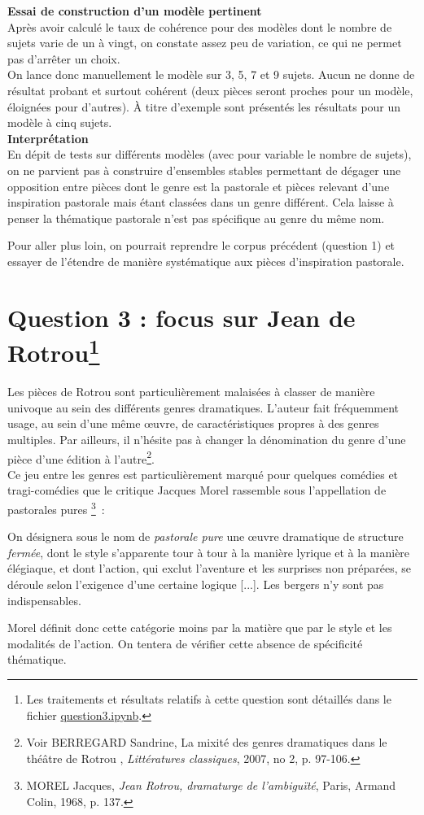 \documentclass[a4paper,twoside,12pt]{article}
\begin{document}
\textbf{Essai de construction d'un modèle pertinent}\\
Après avoir calculé le taux de cohérence pour des modèles dont le nombre de sujets varie de un à vingt, on constate assez peu de variation, ce qui ne permet pas d'arrêter un choix.\\
On lance donc manuellement le modèle sur 3, 5, 7 et 9 sujets. Aucun ne donne de résultat probant et surtout cohérent (deux pièces seront proches pour un modèle, éloignées pour d'autres). À titre d'exemple sont présentés les résultats pour un modèle à cinq sujets.\\

\textbf{Interprétation}\\
En dépit de tests sur différents modèles (avec pour variable le nombre de sujets), on ne parvient pas à construire d'ensembles stables permettant de dégager une opposition entre pièces dont le genre est la pastorale et pièces relevant d'une inspiration pastorale mais étant classées dans un genre différent.
Cela laisse à penser la thématique pastorale n'est pas spécifique au genre du même nom.

Pour aller plus loin, on pourrait reprendre le corpus précédent (question 1) et essayer de l'étendre de manière systématique aux pièces d'inspiration pastorale.

\section*{Question 3 : focus sur Jean de Rotrou\footnote{Les traitements et résultats relatifs à cette question sont détaillés dans le fichier \href{https://github.com/ragbx/enc-eval-philo-comp/blob/master/question3.ipynb}{question3.ipynb}.}}
Les pièces de Rotrou sont particulièrement malaisées à classer de manière univoque au sein des différents genres dramatiques. L'auteur fait fréquemment usage, au sein d'une même œuvre, de caractéristiques propres à des genres multiples. Par ailleurs, il n'hésite pas à changer la dénomination du genre d'une pièce d'une édition à l'autre\footnote{Voir BERREGARD Sandrine, \og La mixité des genres dramatiques dans le théâtre de Rotrou \fg{}, \textit{Littératures classiques}, 2007, no 2, p. 97-106.}.\\
Ce jeu entre les genres est particulièrement marqué pour quelques comédies et tragi-comédies que le critique Jacques Morel rassemble sous l’appellation de \og pastorales pures \fg{}\footnote{MOREL Jacques, \textit{Jean Rotrou, dramaturge de l’ambiguïté}, Paris, Armand Colin, 1968, p. 137.}\ :
\begin{displayquote}
On désignera sous le nom de \textit{pastorale pure} une œuvre dramatique de structure \textit{fermée}, dont le style s'apparente tour à tour à la manière lyrique et à la manière élégiaque, et dont l'action, qui exclut l'aventure et les surprises non préparées, se déroule selon l'exigence d'une certaine logique [...]. Les bergers n'y sont pas indispensables.
\end{displayquote}
Morel définit donc cette catégorie moins par la matière que par le style et les modalités de l'action. On tentera de vérifier cette absence de spécificité thématique.\\
\end{document}
